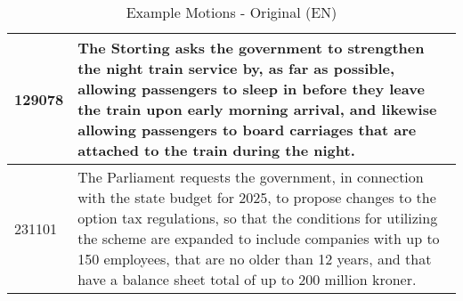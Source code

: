 {\begin{table}[H]
\begin{center}
\begin{tabularx}{\linewidth}{| l | X |}
\hline
129078 & The Storting asks the government to strengthen the night train service by, as far as possible, allowing passengers to sleep in before they leave the train upon early morning arrival, and likewise allowing passengers to board carriages that are attached to the train during the night. \\
\hline
231101 & The Parliament requests the government, in connection with the state budget for 2025, to propose changes to the option tax regulations, so that the conditions for utilizing the scheme are expanded to include companies with up to 150 employees, that are no older than 12 years, and that have a balance sheet total of up to 200 million kroner. \\
\hline
\end{tabularx}
\end{center}
\caption{Example Motions - Original (EN)}
\label{OriginalEN}
\end{table}
}


